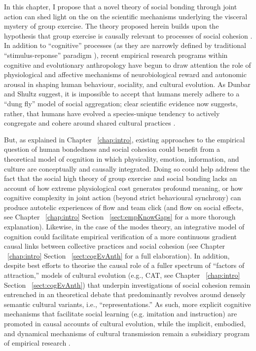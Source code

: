 \begin{CJK}{UTF8}{gbsn}
In this chapter, I propose that a novel theory of social bonding through joint action can shed light on the on the scientific mechanisms underlying the visceral mystery of group exercise. The theory proposed herein builds upon the hypothesis that group exercise is causally relevant to processes of social cohesion \citep{Dunbar2010,Whitehouse2014,Cohen2017}.  In addition to ``cognitive'' processes (as they are narrowly defined by traditional ``stimulus-reponse'' paradigm \citep[e.g.][]{Marr1985}), recent empirical research programs within cognitive and evolutionary anthropology have begun to draw attention the role of physiological and affective mechanisms of neurobiological reward and autonomic arousal in shaping human behaviour, sociality, and cultural evolution.  As Dunbar and Shultz suggest, it is impossible to accept that humans merely adhere to a ``dung fly'' model of social aggregation; clear scientific evidence now suggests, rather, that humans have evolved a species-unique tendency to actively congregate and cohere around shared cultural practices \citep[cf.][]{Tomasello2005}.

But, as explained in Chapter ~\ref{chap:intro}, existing approaches to the empirical question of human bondedness and social cohesion could benefit from a theoretical model of cognition in which physicality, emotion, information, and culture are conceptually and causally integrated. Doing so could help address the fact that the social high theory of group exercise and social bonding \citep[cf.][]{Cohen2017} lacks an account of how extreme physiological cost generates profound meaning, or how cognitive complexity in joint action (beyond strict behavioural synchrony) can produce autotelic experiences of flow and team click (and flow on social effects, see Chapter ~\ref{chap:intro} Section ~\ref{sect:empKnowGaps} for a more thorough explanation).  Likewise, in the case of the modes theory, an integrative model of cognition could facilitate empirical verification of a more continuous gradient causal links between collective practices and social cohesion (see Chapter ~\ref{chap:intro} Section ~\ref{sect:cogEvAnth} for a full elaboration).  In addition, despite best efforts to theorise the causal role of a fuller spectrum of ``factors of attraction,'' models of cultural evolution (e.g., CAT, see Chapter ~\ref{chap:intro} Section ~\ref{sect:cogEvAnth}) that underpin investigations of social cohesion remain entrenched in an theoretical debate that predominantly revolves around densely semantic cultural variants, i.e., ``representations.''  As such, more explicit cognitive mechanisms that facilitate social learning (e.g. imitation and instruction) are promoted in causal accounts of cultural evolution, while the implicit, embodied, and dynamical mechanisms of cultural transmission remain a subsidiary program of empirical research \citep{Lerique2016}.


\end{CJK}
